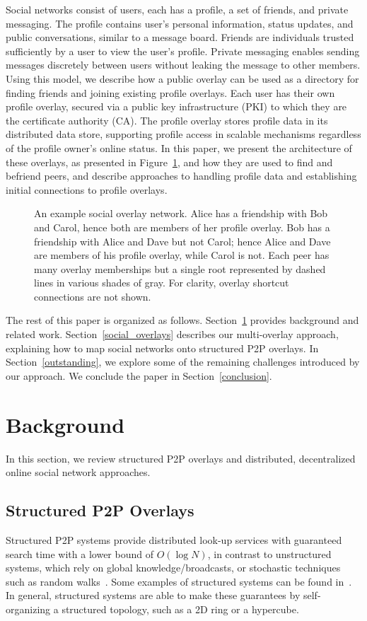 \documentclass[letterpaper,twocolumn,10pt]{article}
\begin{document}
Social networks consist of users, each has a profile, a set
of friends, and private messaging.  The profile contains user's
personal information, status updates, and public conversations, similar to a
message board.  Friends are individuals trusted sufficiently by a user to view
the user's profile.  Private
messaging enables sending messages discretely between users without leaking the
message to other members.  Using this model, we describe how a public 
overlay can be used as a directory for finding friends and
joining existing profile overlays.  Each user has their own profile overlay,
secured via a public key infrastructure (PKI) to which they are the certificate
authority (CA).  The profile overlay stores profile data in its distributed
data store, supporting profile access in scalable mechanisms
regardless of the profile owner's online status.  In this paper, we present
the architecture of these overlays, as presented in Figure~\ref{fig:system}, and
how they are used to find and befriend peers, and describe approaches to
handling profile data and establishing initial connections to profile overlays.

\begin{figure}[h]
\centering
{}
\caption{An example social overlay network.  Alice has a friendship with Bob and
Carol, hence both are members of her profile overlay. Bob has a
friendship with Alice and Dave but not Carol; hence Alice and Dave are members of
his profile overlay, while Carol is not.  Each peer has many overlay memberships
but a single root represented by dashed lines in various shades of gray.
For clarity, overlay shortcut connections are not shown.}
\label{fig:system}
\end{figure}

The rest of this paper is organized as follows.  Section~\ref{background}
provides background and related work.  Section~\ref{social_overlays} describes
our multi-overlay approach, explaining how to map social networks onto structured
P2P overlays.  In Section~\ref{outstanding}, we explore some of the remaining
challenges introduced by our approach.  We conclude the paper in
Section~\ref{conclusion}.

\section{Background}
\label{background}
In this section, we review structured P2P overlays and distributed,
decentralized online social network approaches.
\subsection{Structured P2P Overlays}
Structured P2P systems provide distributed look-up services with guaranteed
search time with a lower bound of $O(\log N)$, in contrast to unstructured
systems, which rely on global knowledge/broadcasts, or stochastic techniques
such as random walks~\cite{unstructured_v_structured}.  Some examples of
structured systems can be found in~\cite{pastry, chord, symphony, kademlia,
can, dynamo}.  In general, structured systems are able to make these guarantees by
self-organizing a structured topology, such as a 2D ring or a hypercube.
\end{document}

